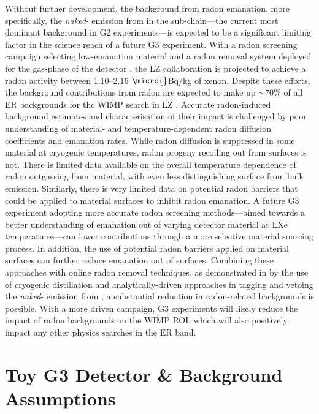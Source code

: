Without further development, the background from radon emanation, more specifically, the \textit{naked}-\beta{} emission from \PbTOF{} in the \RnTTT{} sub-chain---the current most dominant background in G2 experiments---is expected to be a significant limiting factor in the science reach of a future G3 experiment. With a radon screening campaign selecting low-emanation material and a radon removal system deployed for the gas-phase of the detector \cite{lz_screening, lz_tdr}, the LZ collaboration is projected to achieve a radon activity between 1.10--2.16 $\micro{}$Bq/kg of xenon. Despite these efforts, the background contributions from radon are expected to make up $\sim70\%$ of all ER backgrounds for the WIMP search in LZ \cite{akerib2018projected}. Accurate radon-induced background estimates and characterisation of their impact is challenged by poor understanding of material- and temperature-dependent radon diffusion coefficients and emanation rates. While radon diffusion is suppressed in some material at cryogenic temperatures, radon progeny recoiling out from surfaces is not. There is limited data available on the overall temperature dependence of radon outgassing from material, with even less distinguishing surface from bulk emission. Similarly, there is very limited data on potential radon barriers that could be applied to material surfaces to inhibit radon emanation. A future G3 experiment adopting more accurate radon screening methods---aimed towards a better understanding of emanation out of varying detector material at LXe temperatures---can lower contributions through a more selective material sourcing process. In addition, the use of potential radon barriers applied on material surfaces can further reduce emanation out of surfaces. Combining these approaches with online radon removal techniques, as demonstrated in \cite{Aprile:2017kop} by the use of cryogenic distillation and analytically-driven approaches in tagging and vetoing the \textit{naked}-\beta{} emission from \PbTOF{}, a substantial reduction in radon-related backgrounds is possible. With a more driven campaign, G3 experiments will likely reduce the impact of radon backgrounds on the WIMP ROI, which will also positively impact any other physics searches in the ER band.  


\section{Toy G3 Detector \& Background Assumptions}
\label{sec:g3_assumptions}

